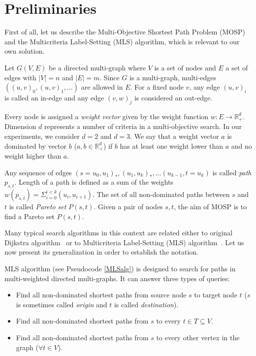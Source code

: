 
\section{Preliminaries}
\label{secPreliminaries}

First of all, let us describe the Multi-Objective Shortest Path Problem (MOSP) and the Multicriteria Label-Setting (MLS) algorithm, which is relevant to our own solution.

Let $G(V,E)$ be a directed multi-graph where $V$ is a set of nodes and $E$ a set
of edges with $|V| = n$ and $|E| = m$. Since $G$ is a multi-graph, multi-edges
$((u,v)_0,(u,v)_1,\dots)$ are allowed in $E$. For a fixed node $v$, any edge $(u,v)_i$ is called an in-edge and any edge $(v,w)_j$ is considered an out-edge.

Every node is assigned a \emph{weight vector} given by the weight function $w: E \rightarrow \mathbb{R}_+^d$. Dimension $d$ represents a number of criteria in a multi-objective search. 
In our experiments, we consider $d=2$ and $d=3$.
We say that a weight vector $a$ is dominated by vector $b$ ($a,b \in \mathbb{R}_+^d$) if
$b$ has at least one weight lower than $a$ and no weight higher than $a$. 

Any sequence of edges $(s \! = \! u_0,u_1)_*,(u_1,u_k)_*,\dots(u_{k-1},t \! = \! u_k)$ is called
\emph{path} $p_{s,t}$. Length of a path is defined as a sum of the weights 
$w(p_{s,t}) = \Sigma_{i=0}^{i<k} (u_i,u_{i+1})$. The set of all non-dominated paths between $s$ and $t$ is called {\em Pareto set}
$P(s,t)$. Given a pair of nodes $s,t$, the aim of MOSP is to find a Pareto set $P(s,t)$.

\vskip 5mm

Many typical search algorithms in this context are related either to original Dijkstra algorithm~\cite{dijkstra1959note} or to Multicriteria Label-Setting (MLS) algorithm~\cite{martins1984multicriteria}. Let us now present its generalization in order to establish the notation.

MLS algorithm (see Pseudocode \ref{MLSalg}) is designed to search for paths in multi-weighted directed multi-graphs. It can answer three types of queries:
\begin{itemize}
\item Find all non-dominated shortest paths from source node $s$ to target node $t$ ($s$ is sometimes called {\em origin} and $t$ is called {\em destination}).
\item Find all non-dominated shortest paths from $s$ to every $t \in T \subseteq V$.
\item Find all non-dominated shortest paths from $s$ to every other vertex in the graph ($\forall t \in V$).
\end{itemize}

